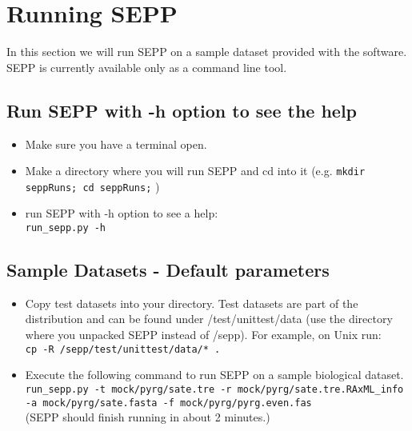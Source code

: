 \documentclass[11pt]{article} %
\newcommand{\sepp}{SEPP\xspace}
\newcommand{\ins}[1]{{\tt #1}}
\newcommand{\file}[1]{{\sf #1}}
\newcommand{\sepphome} {\file{{\raise.17ex\hbox{$\scriptstyle\sim$}}/sepp}\xspace}
\begin{document}
\section{Running \sepp}
In this section we will run \sepp on a sample dataset provided with the software. \sepp is currently available only as a command line tool. 

\subsection{Run \sepp with -h option to see the help}

\begin{itemize}
\item Make sure you have a terminal open.
\item Make a directory where you will run \sepp and cd into it (e.g. \ins{mkdir seppRuns; cd seppRuns;} )
\item run \sepp with -h option to see a help:\\

\ins{run\_sepp.py -h}
\end{itemize}


\subsection{Sample Datasets - Default parameters}
\begin{itemize}
\item Copy test datasets into your directory. Test datasets are part of the distribution and can be found under \file{\sepphome/test/unittest/data} (use the directory where you unpacked \sepp instead of \sepphome).
For example, on Unix run:\\ \ins{cp -R \sepphome/test/unittest/data/*  .} 

\item Execute the following command to run \sepp on a sample biological dataset.\\

\ins{run\_sepp.py -t mock/pyrg/sate.tre -r mock/pyrg/sate.tre.RAxML\_info -a mock/pyrg/sate.fasta -f mock/pyrg/pyrg.even.fas} \\

(\sepp should finish running in about 2 minutes.) 
\end{itemize}
\end{document}
